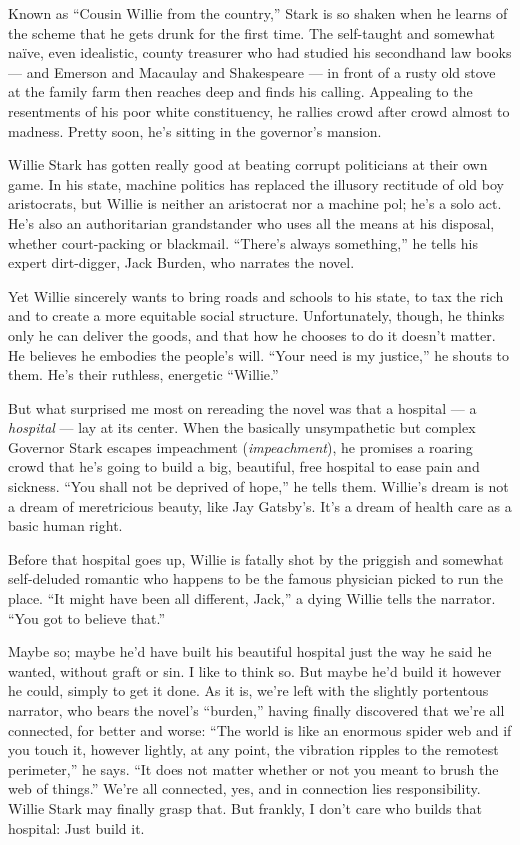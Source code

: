 Known as ``Cousin Willie from the country,'' Stark is so shaken when he
learns of the scheme that he gets drunk for the first time. The
self-taught and somewhat naïve, even idealistic, county treasurer who
had studied his secondhand law books --- and Emerson and Macaulay and
Shakespeare --- in front of a rusty old stove at the family farm then
reaches deep and finds his calling. Appealing to the resentments of his
poor white constituency, he rallies crowd after crowd almost to madness.
Pretty soon, he's sitting in the governor's mansion.

Willie Stark has gotten really good at beating corrupt politicians at
their own game. In his state, machine politics has replaced the illusory
rectitude of old boy aristocrats, but Willie is neither an aristocrat
nor a machine pol; he's a solo act. He's also an authoritarian
grandstander who uses all the means at his disposal, whether
court-packing or blackmail. ``There's always something,'' he tells his
expert dirt-digger, Jack Burden, who narrates the novel.

Yet Willie sincerely wants to bring roads and schools to his state, to
tax the rich and to create a more equitable social structure.
Unfortunately, though, he thinks only he can deliver the goods, and that
how he chooses to do it doesn't matter. He believes he embodies the
people's will. ``Your need is my justice,'' he shouts to them. He's
their ruthless, energetic ``Willie.''

But what surprised me most on rereading the novel was that a hospital
--- a \emph{hospital} --- lay at its center. When the basically
unsympathetic but complex Governor Stark escapes impeachment
(\emph{impeachment}), he promises a roaring crowd that he's going to
build a big, beautiful, free hospital to ease pain and sickness. ``You
shall not be deprived of hope,'' he tells them. Willie's dream is not a
dream of meretricious beauty, like Jay Gatsby's. It's a dream of health
care as a basic human right.

Before that hospital goes up, Willie is fatally shot by the priggish and
somewhat self-deluded romantic who happens to be the famous physician
picked to run the place. ``It might have been all different, Jack,'' a
dying Willie tells the narrator. ``You got to believe that.''

Maybe so; maybe he'd have built his beautiful hospital just the way he
said he wanted, without graft or sin. I like to think so. But maybe he'd
build it however he could, simply to get it done. As it is, we're left
with the slightly portentous narrator, who bears the novel's ``burden,''
having finally discovered that we're all connected, for better and
worse: ``The world is like an enormous spider web and if you touch it,
however lightly, at any point, the vibration ripples to the remotest
perimeter,'' he says. ``It does not matter whether or not you meant to
brush the web of things.'' We're all connected, yes, and in connection
lies responsibility. Willie Stark may finally grasp that. But frankly, I
don't care who builds that hospital: Just build it.

